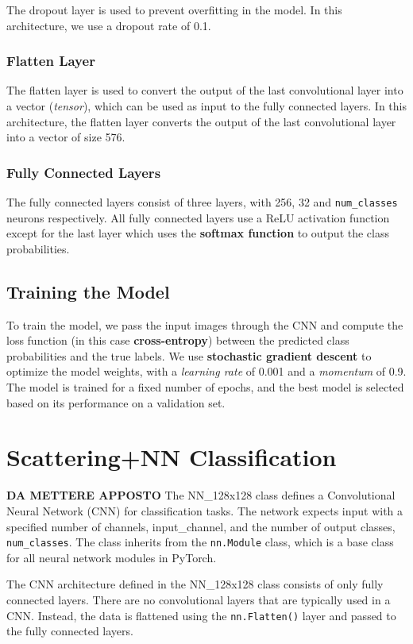 \documentclass{report}
\begin{document}
The dropout layer is used to prevent overfitting in the model. In this architecture, we use a dropout rate of 0.1.
\subsection{Flatten Layer}

The flatten layer is used to convert the output of the last convolutional layer into a vector (\textit{tensor}), which can be used as input to the fully connected layers. In this architecture, the flatten layer converts the output of the last convolutional layer into a vector of size 576.

\subsection{Fully Connected Layers}
The fully connected layers consist of three layers, with 256, 32 and \texttt{num\_classes}  neurons respectively. All fully connected layers use a ReLU activation function except for the last layer which uses the \textbf{softmax function} to output the class probabilities.

\section{Training the Model}

To train the model, we pass the input images through the CNN and compute the loss function (in this case \textbf{cross-entropy}) between the predicted class probabilities and the true labels. We use \textbf{stochastic gradient descent} to optimize the model weights, with a \textit{learning rate} of 0.001 and a \textit{momentum} of 0.9. The model is trained for a fixed number of epochs, and the best model is selected based on its performance on a validation set.

\chapter{Scattering+NN Classification}
\textbf{DA METTERE APPOSTO}
The NN\_128x128 class defines a Convolutional Neural Network (CNN) for classification tasks. The network expects input with a specified number of channels, input\_channel, and the number of output classes, \texttt{num\_classes}. The class inherits from the \texttt{nn.Module} class, which is a base class for all neural network modules in PyTorch.

The CNN architecture defined in the NN\_128x128 class consists of only fully connected layers. There are no convolutional layers that are typically used in a CNN. Instead, the data is flattened using the \texttt{nn.Flatten()} layer and passed to the fully connected layers.
\end{document}
